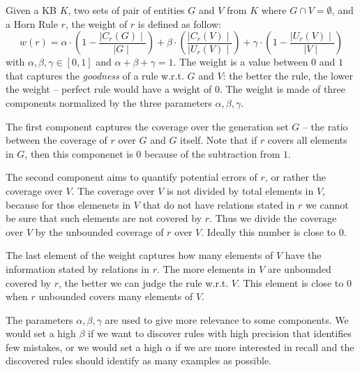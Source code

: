 Given a KB $K$, two sets of pair of entities $G$ and $V$ from $K$ where $G \cap V = \emptyset$, and a Horn Rule $r$, the weight of $r$ is defined as follow:
\begin{equation*}
	w(r) = \alpha \cdot (1-\frac{\mid C_{r}(G)\mid}{\mid G \mid}) +\beta \cdot (\frac{\mid C_{r}(V) \mid}{\mid U_{r}(V)\mid})  +\gamma \cdot (1-\frac{\mid U_{r}(V)\mid}{\mid V \mid})
\end{equation*}
with $\alpha,\beta,\gamma \in [0,1]$ and $\alpha + \beta + \gamma = 1$. The weight is a value between $0$ and $1$ that captures the \emph{goodness} of a rule w.r.t. $G$ and $V$: the better the rule, the lower the weight -- perfect rule would have a weight of $0$. The weight is made of three components normalized by the three parameters $\alpha,\beta,\gamma$.
\begin{inparaenum}[\itshape(i)]
	\item The first component captures the coverage over the generation set $G$ -- the ratio between the coverage of $r$ over $G$ and $G$ itself. Note that if $r$ covers all elements in $G$, then this componenet is $0$ because of the subtraction from $1$.
	\item The second component aims to quantify potential errors of $r$, or rather the coverage over $V$. The coverage over $V$ is not divided by total elements in $V$, because 
	for thos elemenets in $V$ that do not have relations stated in $r$ we cannot be sure that such elements are not covered by $r$. Thus we divide the coverage over $V$ by the unbounded coverage of $r$ over $V$. Ideally this number is close to $0$.
	\item The last element of the weight captures how many elements of $V$ have the information stated by relations in $r$. The more elements in $V$ are unbounded covered by $r$, the better we can judge the rule w.r.t. $V$. This element is close to $0$ when $r$ unbounded covers many elements of $V$. 
\end{inparaenum}
The parameters $\alpha,\beta,\gamma$ are used to give more relevance to some components. We would set a high $\beta$ if we want to discover rules with high precision that identifies few mistakes, or we would set a high $\alpha$ if we are more interested in recall and the discovered rules should identify as many examples as possible.

